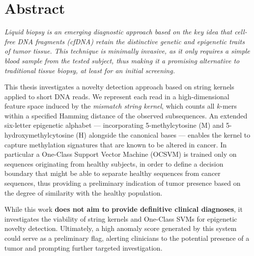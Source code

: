 \chapter*{Abstract}

{\itshape
Liquid biopsy is an emerging diagnostic approach based on the key idea that cell-free DNA fragments (cfDNA) retain the distinctive genetic and epigenetic traits of tumor tissue.
This technique is minimally invasive, as it only requires a simple blood sample from the tested subject, thus making it a promising alternative to traditional tissue biopsy, at least for an initial screening. 

This thesis investigates a novelty detection approach based on string kernels
applied to short DNA reads. We represent each read in a high-dimensional feature
space induced by the \emph{mismatch string kernel}, which counts all $k$-mers
within a specified Hamming distance of the observed subsequences. An extended
six-letter epigenetic alphabet --- incorporating 5-methylcytosine (M) and
5-hydroxymethylcytosine (H) alongside the canonical bases --- enables the kernel
to capture methylation signatures that are known to be altered in cancer.
In particular a One-Class Support Vector Machine (OCSVM) is trained only on sequences originating from healthy subjects, in order to define a decision boundary that might be able to separate healthy sequences from cancer sequences, thus providing a preliminary indication of tumor presence based on the degree of similarity with the healthy population. 

While this work \textbf{does not aim to provide definitive clinical diagnoses}, it investigates the viability of string kernels and One-Class SVMs for epigenetic novelty detection. Ultimately, a high anomaly score generated by this system could serve as a preliminary flag, alerting clinicians to the potential presence of a tumor and prompting further targeted investigation.
}
